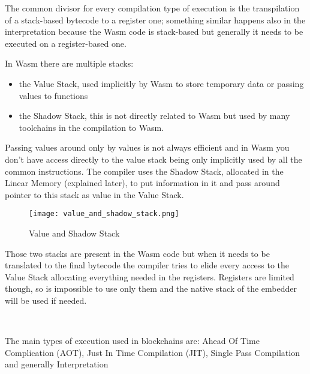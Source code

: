 The common divisor for every compilation type of execution is the transpilation of a stack-based bytecode to a register one; something similar happens also in the interpretation because the Wasm code is stack-based but generally it needs to be executed on a register-based one.

In Wasm there are multiple stacks:
\begin{itemize}
  \item the Value Stack, used implicitly by Wasm to store temporary data or passing values to functions
  \item  the Shadow Stack, this is not directly related to Wasm but used by many toolchains in the compilation to Wasm.
\end{itemize}

Passing values around only by values is not always efficient and in Wasm you don't have access directly to the value stack being only implicitly used by all the common instructions. The compiler uses the Shadow Stack, allocated in the Linear Memory (explained later), to put information in it and pass around pointer to this stack as value in the Value Stack.

\begin{figure}[h]
  \centering
  \texttt{[image: value\_and\_shadow\_stack.png]}
  \caption{Value and Shadow Stack}
  \label{fig:value-shadow-stack}
\end{figure}

Those two stacks are present in the Wasm code but when it needs to be translated to the final bytecode the compiler tries to elide every access to the Value Stack allocating everything needed in the registers. Registers are limited though, so is impossible to use only them and the native stack of the embedder will be used if needed.

\

The main types of execution used in blockchains are: Ahead Of Time Complication (AOT), Just In Time Compilation (JIT), Single Pass Compilation and generally Interpretation


